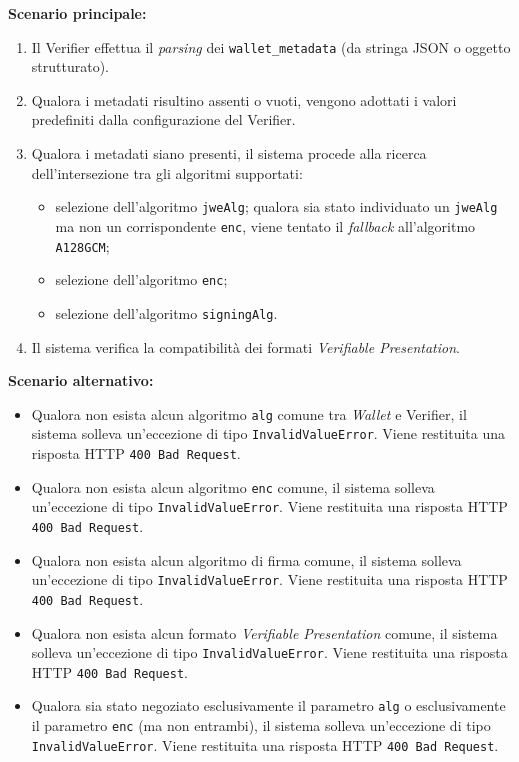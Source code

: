 \noindent\textbf{Scenario principale:}
\begin{enumerate}
    \item Il Verifier effettua il \textit{parsing} dei \texttt{wallet\_\allowbreak{}metadata} (da stringa JSON o oggetto strutturato).
    \item Qualora i metadati risultino assenti o vuoti, vengono adottati i valori predefiniti dalla configurazione del Verifier.
    \item Qualora i metadati siano presenti, il sistema procede alla ricerca dell'intersezione tra gli algoritmi supportati:
    \begin{itemize}
        \item selezione dell'algoritmo \texttt{jweAlg}; qualora sia stato individuato un \texttt{jweAlg} ma non un corrispondente \texttt{enc}, viene tentato il \textit{fallback} all'algoritmo \texttt{A128GCM};
        \item selezione dell'algoritmo \texttt{enc};
        \item selezione dell'algoritmo \texttt{signingAlg}.
    \end{itemize}
    \item Il sistema verifica la compatibilità dei formati \textit{Verifiable Presentation}.
\end{enumerate}

\noindent\textbf{Scenario alternativo:}
\begin{itemize}
    \item Qualora non esista alcun algoritmo \texttt{alg} comune tra \textit{Wallet} e Verifier, il sistema solleva un'eccezione di tipo \texttt{InvalidValueError}. Viene restituita una risposta HTTP \texttt{400 Bad Request}.
    \item Qualora non esista alcun algoritmo \texttt{enc} comune, il sistema solleva un'eccezione di tipo \texttt{InvalidValueError}. Viene restituita una risposta HTTP \texttt{400 Bad Request}.
    \item Qualora non esista alcun algoritmo di firma comune, il sistema solleva un'eccezione di tipo \texttt{InvalidValueError}. Viene restituita una risposta HTTP \texttt{400 Bad Request}.
    \item Qualora non esista alcun formato \textit{Verifiable Presentation} comune, il sistema solleva un'eccezione di tipo \texttt{InvalidValueError}. Viene restituita una risposta HTTP \texttt{400 Bad Request}.
    \item Qualora sia stato negoziato esclusivamente il parametro \texttt{alg} o esclusivamente il parametro \texttt{enc} (ma non entrambi), il sistema solleva un'eccezione di tipo \texttt{InvalidValueError}. Viene restituita una risposta HTTP \texttt{400 Bad Request}.
\end{itemize}

